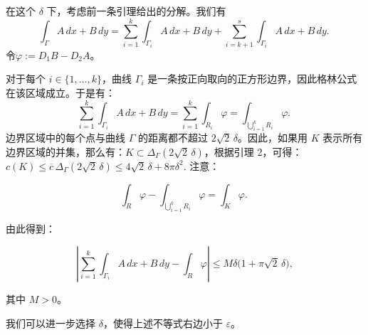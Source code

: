 在这个 $\delta$ 下，考虑前一条引理给出的分解。我们有
$$
\int_{\Gamma} A\,dx + B\,dy 
= \sum_{i=1}^{k} \int_{\Gamma_i} A\,dx + B\,dy 
+ \sum_{i=k+1}^{s} \int_{\Gamma_i} A\,dx + B\,dy.~
$$
令$\varphi := D_1 B - D_2 A$。

对于每个 $i \in \{1, \ldots, k\}$，曲线 $\Gamma_i$ 是一条按正向取向的正方形边界，因此格林公式在该区域成立。于是有：
$$
\sum_{i=1}^{k} \int_{\Gamma_i} A\,dx + B\,dy 
= 
\sum_{i=1}^{k} \int_{R_i} \varphi
= 
\int_{\bigcup_{i=1}^{k} R_i} \varphi.~
$$
边界区域中的每个点与曲线 $\Gamma$ 的距离都不超过 $2\sqrt{2}\,\delta$。因此，如果用 $K$ 表示所有边界区域的并集，那么有：$K \subset \Delta_{\Gamma}(2\sqrt{2}\,\delta)$，根据引理 2，可得：$c(K) \leq \overline{c}\,\Delta_{\Gamma}(2\sqrt{2}\,\delta)\leq 4\sqrt{2}\,\delta + 8\pi\delta^2$.
注意：

$$
\int_{R} \varphi - \int_{\bigcup_{i=1}^{k} R_i} \varphi
= 
\int_{K} \varphi.~
$$

由此得到：

$$
\left| 
\sum_{i=1}^{k} \int_{\Gamma_i} A\,dx + B\,dy 
- 
\int_{R} \varphi 
\right|
\leq 
M\delta \bigl(1 + \pi\sqrt{2}\,\delta \bigr),
$$

其中 $M > 0$。

我们可以进一步选择 $\delta$，使得上述不等式右边小于 $\varepsilon$。
